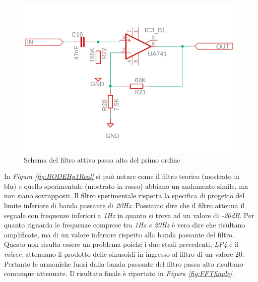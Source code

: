 \documentclass[titlepage]{report}
\begin{document}
	\begin{figure}[H]
		\centering
		\includegraphics[scale=0.5]{Immagini/sch_hp1.pdf}
		\caption{Schema del filtro attivo passa alto del primo ordine}
		\label{fig:sch_hp1}
	\end{figure}

	In \textit{Figura \ref{fig:BODEHp1Real}} si può notare come il filtro teorico (mostrato in blu) e quello sperimentale (mostrato in rosso) abbiano un andamento simile, ma non siano sovrapposti. Il filtro sperimentale rispetta la specifica di progetto del limite inferiore di banda passante di \textit{20Hz}. Possiamo dire che il filtro attenua il segnale con frequenze inferiori a \textit{1Hz} in quanto si trova ad un valore di \textit{-20dB}. Per quanto riguarda le frequenze comprese tra \textit{1Hz e 20Hz} è vero dire che risultano amplificate, ma di un valore inferiore rispetto alla banda passante del filtro. Questo non risulta essere un problema poiché i due stadi precedenti, \textit{LP4} e il \textit{mixer}, attenuano il prodotto delle sinusoidi in ingresso al filtro di un valore 20. Pertanto le armoniche fuori dalla banda passante del filtro passa alto risultano comunque attenuate. Il risultato finale è riportato in \textit{Figura \ref{fig:FFTfinale}}.
\end{document}
